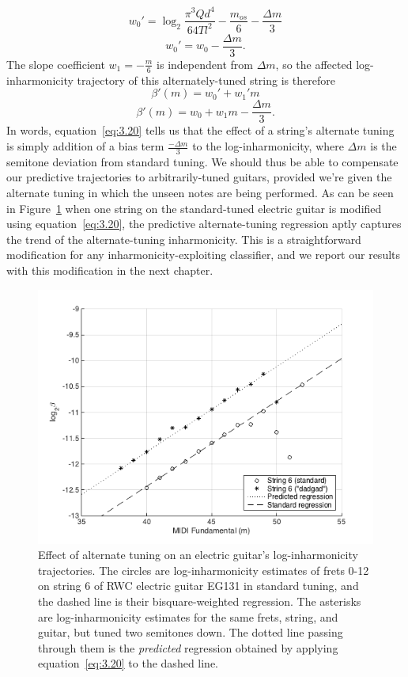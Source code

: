 \documentclass[12pt]{cmuthesis}
\begin{document}
\begin{equation}
\label{eq:3.17}
w_{0}' = \log_2\frac{\pi^3 Q d^4}{64 T l^2} - \frac{m_{os}}{6} - \frac{\Delta m}{3}
\end{equation}
\begin{equation}
\label{eq:3.18}
w_{0}' = w_0 - \frac{\Delta m}{3}.
\end{equation}
The slope coefficient $w_1 = -\frac{m}{6}$ is independent from ${\Delta m}$, so the affected log-inharmonicity trajectory of this alternately-tuned string is therefore
\begin{equation}
\label{eq:3.19}
\beta'(m) = w_0' + w_1'm
\end{equation}
\begin{equation}
\label{eq:3.20}
\beta'(m) = w_0 + w_1m - \frac{\Delta m}{3}.
\end{equation}
In words, equation~\eqref{eq:3.20} tells us that the effect of a string's alternate tuning is simply addition of a bias term $\frac{-\Delta m}{3}$ to the log-inharmonicity, where $\Delta m$ is the semitone deviation from standard tuning. We should thus be able to compensate our predictive trajectories to arbitrarily-tuned guitars, provided we're given the alternate tuning in which the unseen notes are being performed. As can be seen in Figure~\ref{fig:tuning-eg} when one string on the standard-tuned electric guitar is modified using equation~\eqref{eq:3.20}, the predictive alternate-tuning regression aptly captures the trend of the alternate-tuning inharmonicity. This is a straightforward modification for any inharmonicity-exploiting classifier, and we report our results with this modification in the next chapter.
\begin{figure}[!htbp] 
\label{fig:tuning-eg}
\centering
\includegraphics[scale=0.75]{tuning-eg}
\caption{Effect of alternate tuning on an electric guitar's log-inharmonicity trajectories. The circles are log-inharmonicity estimates of frets 0-12 on string 6 of RWC electric guitar EG131 in standard tuning, and the dashed line is their bisquare-weighted regression. The asterisks are log-inharmonicity estimates for the same frets, string, and guitar, but tuned two semitones down. The dotted line passing through them is the \textit{predicted} regression obtained by applying equation~\eqref{eq:3.20} to the dashed line.}
\end{figure}
\end{document}

